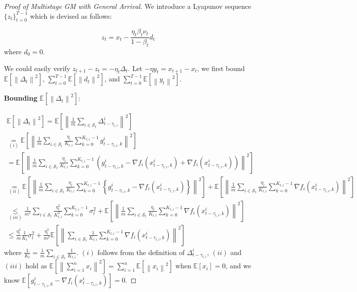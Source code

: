 \begin{proof}[Proof of Multistage GM with General Arrival]



We introduce a Lyapunov sequence $\{z_t\}_{t=0}^{T-1}$ which is devised as follows:

\begin{equation}
\label{auxiliary_seq}
z_t= x_t-\frac{\eta_t\beta_t\nu_t}{1-\beta_t}d_{t}
\end{equation}
where $d_0=0$.

We could easily verify $z_{t+1}-z_t= -\eta_t \Delta_t$. Let $-\eta y_t=x_{t+1}-x_t$, we first bound $\mathbb{E}\left[\left\| \Delta_t\right\|^2\right]$, $\sum_{t=0}^{T-1}\mathbb{E}\left[\left\| d_t\right\|^2\right]$, and $\sum_{t=0}^{T-1}\mathbb{E}\left[\left\| y_t\right\|^2\right]$.


\textbf{Bounding} $\mathbb{E}\left[\left\| \Delta_t\right\|^2\right]$:

\begin{equation}
\begin{gathered}
\mathbb{E}\left[\left\| \Delta_t\right\|^2\right] = \mathbb{E}\left[\left\| \frac{1}{m}\sum_{i\in\mathcal{S}_t}\Delta^i_{t-\tau_{t,i}} \right\|^2\right]\\
\underset{(i)}{=}\mathbb{E}\left[\left\| \frac{1}{m}\sum_{i\in\mathcal{S}_t}  \frac{\eta_l}{K_{t,i}} \sum_{k=0}^{K_{t,i}-1} g_{t-\tau_{t,i},k}^i \right\|^2\right] \\
= \mathbb{E}\left[\left\| \frac{1}{m}\sum_{i\in\mathcal{S}_t} \frac{\eta_l}{K_{t,i}} \sum_{k=0}^{K_{t,i}-1} \left( g_{t-\tau_{t,i},k}^i - \nabla f_i(x_{t-\tau_{t,i},k}^i) + \nabla f_i(x_{t-\tau_{t,i},k}^i)\right) \right\|^2\right] \\
\underset{(ii)}{=} \mathbb{E}\left[\left\| \frac{1}{m}\sum_{i\in\mathcal{S}_t} \frac{\eta_l}{K_{t,i}} \sum_{k=0}^{K_{t,i}-1} \left\{ g_{t-\tau_{t,i},k}^i - \nabla f_i(x_{t-\tau_{t,i},k}^i) \right\}  \right\|^2\right] + \mathbb{E}\left[\left\| \frac{1}{m}\sum_{i\in\mathcal{S}_t} \frac{\eta_l}{K_{t,i}} \sum_{k=0}^{K_{t,i}-1}  \nabla f_i(x_{t-\tau_{t,i},k}^i) \right\|^2\right]\\
\underset{(iii)}{\leq} \frac{1}{m^2}\sum_{i\in\mathcal{S}_t}\frac{\eta_l^2}{K^2_{t,i}}\sum_{k=0}^{K_{t,i}-1}\sigma_l^2 + \mathbb{E}\left[\left\| \frac{1}{m}\sum_{i\in\mathcal{S}_t} \frac{\eta_l}{K_{t,i}} \sum_{k=0}^{K_{t,i}-1}  \nabla f_i(x_{t-\tau_{t,i},k}^i) \right\|^2\right]\\
\leq \frac{\eta_l^2}{m}\frac{1}{K_t}\sigma^2_l + \frac{\eta_l^2}{m^2}  \mathbb{E}\left[\left\| \sum_{i\in\mathcal{S}_t} \frac{1}{K_{t,i}} \sum_{k=0}^{K_{t,i}-1}  \nabla f_i(x_{t-\tau_{t,i},k}^i) \right\|^2\right]
\end{gathered}\nonumber
\end{equation}
where $\frac{1}{K_t}=\frac{1}{m}\sum_{i\in\mathcal{S}_t}\frac{1}{K_{t,i}}$. $(i)$ follows from the definition of $\Delta^i_{t-\tau_{t,i}}$, $(ii)$ and $(iii)$ hold as $\mathbb{E}\left[\left\|\sum_{i=1}^n x_i\right\|^2\right] = \sum_{i=1}^n \mathbb{E}\left[\left\| x_i \right\|^2\right]$ when $\mathbb{E}\left[ x_i \right]=0$, and we know $\mathbb{E}\left[g_{t-\tau_{t,i},k}^i - \nabla f_i(x_{t-\tau_{t,i},k}^i)\right]=0$.



\end{proof}
